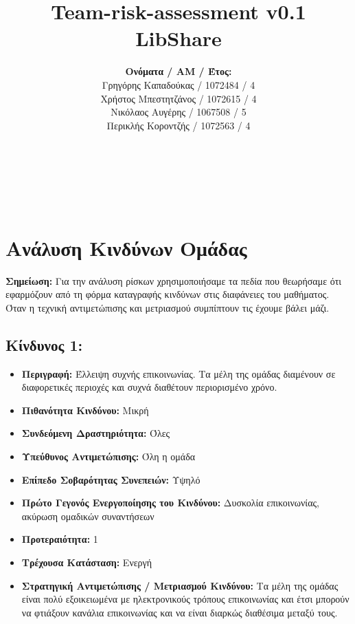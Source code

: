 \documentclass[12pt,a4paper]{article}
\title{Team-risk-assessment v0.1\\ LibShare}
\author{\textbf{Ονόματα / ΑΜ / Έτος:} \\ Γρηγόρης Καπαδούκας / 1072484 / 4\textdegree \\ Χρήστος Μπεστητζάνος / 1072615 / 4\textdegree \\ Νικόλαος Αυγέρης / 1067508 / 5\textdegree \\ Περικλής Κοροντζής / 1072563 / 4\textdegree}
\begin{document}
\makeatletter
\begin{center}
	\LARGE{\@title} \\
	\pagebreak
\end{center}
\begin{LARGE}\@author\end{LARGE} \\
\pagebreak

\section{Ανάλυση Κινδύνων Ομάδας}

\textbf{Σημείωση:} Για την ανάλυση ρίσκων χρησιμοποιήσαμε τα πεδία που θεωρήσαμε ότι εφαρμόζουν από τη φόρμα καταγραφής κινδύνων στις διαφάνειες του μαθήματος. Όταν η τεχνική αντιμετώπισης και μετριασμού συμπίπτουν τις έχουμε βάλει μάζι.

\subsection*{Κίνδυνος 1:}
\begin{itemize}
	\item \textbf{Περιγραφή:} Έλλειψη συχνής επικοινωνίας. Τα μέλη της ομάδας διαμένουν σε διαφορετικές περιοχές και συχνά διαθέτουν περιορισμένο χρόνο.
	\item \textbf{Πιθανότητα Κινδύνου:} Μικρή
	\item \textbf{Συνδεόμενη Δραστηριότητα:} Όλες
	\item \textbf{Υπεύθυνος Αντιμετώπισης:} Όλη η ομάδα
	\item \textbf{Επίπεδο Σοβαρότητας Συνεπειών:} Υψηλό
	\item \textbf{Πρώτο Γεγονός Ενεργοποίησης του Κινδύνου:} Δυσκολία επικοινωνίας, ακύρωση ομαδικών συναντήσεων
	\item \textbf{Προτεραιότητα:} 1
	\item \textbf{Τρέχουσα Κατάσταση:} Ενεργή
	\item \textbf{Στρατηγική Αντιμετώπισης / Μετριασμού Κινδύνου:} Τα μέλη της ομάδας είναι  πολύ εξοικειωμένα με ηλεκτρονικούς τρόπους επικοινωνίας και έτσι μπορούν να φτιάξουν κανάλια επικοινωνίας και να είναι διαρκώς διαθέσιμα μεταξύ τους. 
\end{itemize}
\end{document}
